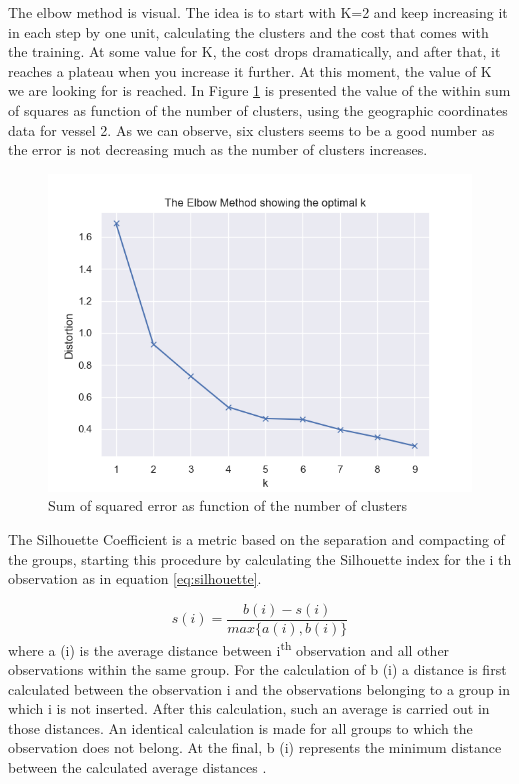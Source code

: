 The elbow method is visual. The idea is to start with K=2 and keep increasing it in each step by one unit, calculating the clusters and the cost that comes with the training. At some value for K, the cost drops dramatically, and after that, it reaches a plateau when you increase it further. At this moment, the value of K we are looking for is reached.
In Figure \ref{fig:elbow_method} is presented the value of the within sum of squares as function of the number of clusters, using the geographic coordinates data for vessel 2. As we can observe, six clusters seems to be a good number as the error is not decreasing much as the number of clusters increases. 


\begin{figure}[]
\centering
\includegraphics[width=0.8\linewidth]{Chapters/img/elbow_method.png}
\caption{Sum of squared error as function of the number of clusters}
\label{fig:elbow_method}
\end{figure}


The Silhouette Coefficient is a metric based on the separation and compacting of the groups, starting this procedure by calculating the Silhouette index for the i th observation as in equation \ref{eq:silhouette}.

\begin{equation}
s(i) = \frac{b(i)-s(i)}{max\{a(i),b(i)\}}
\label{eq:silhouette}
\end{equation}
where a (i) is the average distance between i\textsuperscript{th} observation and all other observations within the same group. 
For the calculation of b (i) a distance is first calculated between the observation i and the observations belonging to a group in which i is not inserted. After this calculation, such an average is carried out in those distances. An identical calculation is made for all groups to which the observation does not belong. At the final, b (i) represents the minimum distance between the calculated average distances \cite{Roelofsen2018BusinessAT}.


